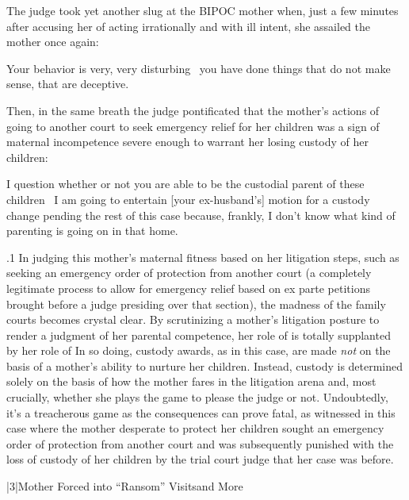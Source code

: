 \documentclass[11pt, twoside]{article}
\begin{document}
{{\nip{}%
The judge took yet another slug at the BIPOC mother when, just a few
minutes after accusing her of acting irrationally and with ill intent, she
assailed the mother once again:

\begin{blockQuote}
Your behavior is very, very disturbing \ellThree{2pt}{2pt}\ you have done things that
do not make sense, that are deceptive.
\end{blockQuote}

\nip{}%
Then, in the same breath the judge pontificated that the mother’s actions
of going to another court to seek emergency relief for her children was
a sign of maternal incompetence severe enough to warrant her losing
custody of her children:

\begin{blockQuote}
I question whether or not you are able to be the custodial parent
of these children \ellThree{2pt}{2pt}\ I am going to entertain [your ex-husband’s]
motion for a custody change pending the rest of this case because,
frankly, I don’t know what kind of parenting is going on in that
home.
\end{blockQuote}

}%

\p.1{%
In judging this mother’s maternal fitness based on her litigation steps,
such as seeking an emergency order of protection from another court (a
completely legitimate process to allow for emergency relief based on ex
parte petitions brought before a judge presiding over that section), the
madness of the family courts becomes crystal clear. By scrutinizing a
mother’s litigation posture to render a judgment of her parental
competence, her role of  is totally supplanted by her
role of  In so doing, custody awards, as in this case,
are made \textit{not} on the basis of a mother’s ability to nurture her children.
Instead, custody is determined solely on the basis of how the mother
fares in the litigation arena and, most crucially, whether she plays the
game to please the judge or not. Undoubtedly, it’s a treacherous game
as the consequences can prove fatal, as witnessed in this case where the
mother desperate to protect her children sought an emergency order of
protection from another court and was subsequently punished with the
loss of custody of her children by the trial court judge that her case was
before.
}%


\s|3|{Mother Forced into ``Ransom'' Visits\mdash{}and More}

}
\end{document}
